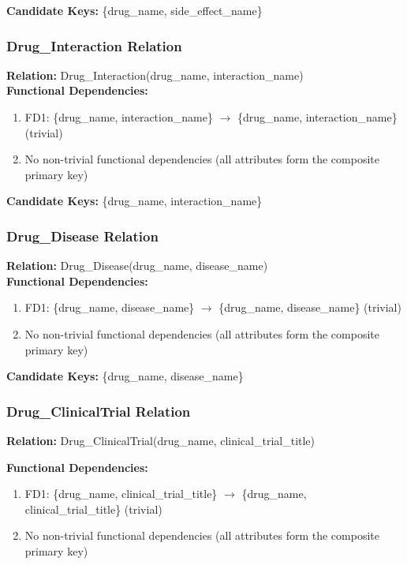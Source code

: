 \documentclass[12pt,a4paper]{article}
\begin{document}
\textbf{Candidate Keys:} \{drug\_name, side\_effect\_name\}

\subsubsection{Drug\_Interaction Relation}
\textbf{Relation:} Drug\_Interaction(drug\_name, interaction\_name)\\

\textbf{Functional Dependencies:}
\begin{enumerate}
    \item FD1: \{drug\_name, interaction\_name\} $\rightarrow$ \{drug\_name, interaction\_name\} (trivial)
    \item No non-trivial functional dependencies (all attributes form the composite primary key)
\end{enumerate}

\textbf{Candidate Keys:} \{drug\_name, interaction\_name\}

\subsubsection{Drug\_Disease Relation}
\textbf{Relation:} Drug\_Disease(drug\_name, disease\_name)\\

\textbf{Functional Dependencies:}
\begin{enumerate}
    \item FD1: \{drug\_name, disease\_name\} $\rightarrow$ \{drug\_name, disease\_name\} (trivial)
    \item No non-trivial functional dependencies (all attributes form the composite primary key)
\end{enumerate}

\textbf{Candidate Keys:} \{drug\_name, disease\_name\}

\subsubsection{Drug\_ClinicalTrial Relation}
\textbf{Relation:} Drug\_ClinicalTrial(drug\_name, clinical\_trial\_title)

\textbf{Functional Dependencies:}
\begin{enumerate}
    \item FD1: \{drug\_name, clinical\_trial\_title\} $\rightarrow$ \{drug\_name, clinical\_trial\_title\} (trivial)
    \item No non-trivial functional dependencies (all attributes form the composite primary key)
\end{enumerate}
\end{document}
